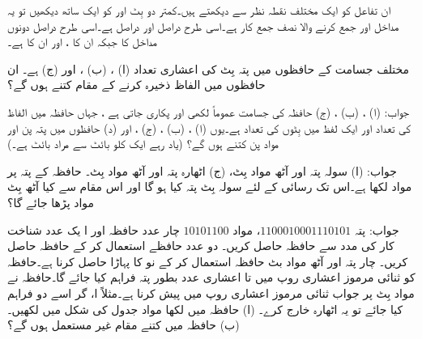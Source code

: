 ان تفاعل کو ایک مختلف نقطہ نظر سے دیکھتے ہیں۔کمتر دو بِٹ  اور  کو ایک ساتھ  دیکھیں تو یہ مداخل  اور  جمع کرنے والا نصف جمع کار ہے۔اسی طرح  دراصل  اور  دراصل  ہے۔اسی طرح  دراصل دونوں مداخل کا  جبکہ  ان کا ،   اور  ان کا ہے۔

  مختلف جسامت کے حافظوں میں پتہ بِٹ  کی  اعشاری تعداد  (ا) ، (ب) ، اور  (ج)   ہے۔  ان حافظوں میں الفاظ ذخیرہ کرنے کے  مقام کتنے  ہوں گے؟
  
  جواب: (ا)  ، (ب) ، (ج) 
 حافظہ کی  جسامت  عموماً  لکھی اور پکاری جاتی ہے ، جہاں   حافظہ میں الفاظ کی تعداد اور  ایک لفظ میں بِٹوں کی تعداد  ہے۔یوں  (ا) ،  (ب)   ، (ج)  ، اور (د)     حافظوں میں پتہ پن  اور  مواد پن کتنے  ہوں گے؟ (یاد رہے  ایک کلو بائٹ سے مراد    بائٹ ہے۔)
 
 جواب: (ا)    سولہ  پتہ اور  آٹھ مواد بِٹ، (ج)  اٹھارہ پتہ اور آٹھ مواد بِٹ۔
 حافظہ کے   پتہ  پر  مواد لکھا ہے۔اس تک رسائی کے لئے سولہ بِٹ  پتہ کیا ہو گا اور اس  مقام سے کیا  آٹھ  بِٹ مواد  پڑھا جائے گا؟
 
 جواب: پتہ   \(1100010001110101\)،   مواد  \(10101100\)
 چار عدد  حافظہ  اور ا یک عدد  شناخت کار کی مدد سے  حافظہ حاصل کریں۔
 دو عدد  حافظے  استعمال  کر کے  حافظہ حاصل کریں۔
 چار پتہ  اور آٹھ مواد بٹ حافظہ استعمال کر کے  نو کا  پہاڑا حاصل کرنا ہے۔حافظہ کو  ثنائی مرموز اعشاری  روپ میں  تا  اعشاری عدد بطور پتہ فراہم کیا جائے گا۔حافظہ نے مواد  بِٹ پر جواب ثنائی  مرموز اعشاری  روپ میں پیش کرنا ہے۔مثلاً ا، گر اسے دو  فراہم کیا جائے تو یہ اٹھارہ   خارج کرے۔ (ا) حافظہ میں لکھا مواد جدول کی شکل میں لکھیں۔ (ب) حافظہ میں کتنے مقام غیر مستعمل ہوں گے؟ 
 

